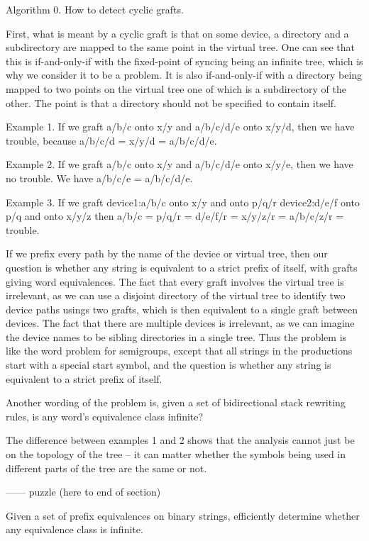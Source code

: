 \documentclass{book}
\begin{document}
Algorithm 0.   How to detect cyclic grafts.

First, what is meant by a cyclic graft is that on some device, a directory and a subdirectory are mapped to the same point in the virtual tree.  One can see that this is if-and-only-if with the fixed-point of syncing being an infinite tree, which is why we consider it to be a problem.  It is also if-and-only-if with a directory being mapped to two points on the virtual tree one of which is a subdirectory of the other.  The point is that a directory should not be specified to contain itself.

Example 1.  If we graft a/b/c onto x/y and a/b/c/d/e onto x/y/d, then we have trouble, because a/b/c/d = x/y/d = a/b/c/d/e.

Example 2.  If we graft a/b/c onto x/y and a/b/c/d/e onto x/y/e, then we have no trouble.  We have a/b/c/e = a/b/c/d/e.

Example 3.  If we graft
	device1:a/b/c onto x/y and onto p/q/r
	device2:d/e/f onto p/q and onto x/y/z
then a/b/c = p/q/r = d/e/f/r = x/y/z/r = a/b/c/z/r = trouble.

If we prefix every path by the name of the device or virtual tree, then our question is whether any string is equivalent to a strict prefix of itself, with grafts giving word equivalences.  The fact that every graft involves the virtual tree is irrelevant, as we can use a disjoint directory of the virtual tree to identify two device paths usings two grafts, which is then equivalent to a single graft between devices.  The fact that there are multiple devices is irrelevant, as we can imagine the device names to be sibling directories in a single tree.  Thus the problem is like the word problem for semigroups, except that all strings in the productions start with a special start symbol, and the question is whether any string is equivalent to a strict prefix of itself.

Another wording of the problem is, given a set of bidirectional stack rewriting rules, is any word's equivalence class infinite?

The difference between examples 1 and 2 shows that the analysis cannot just be on the topology of the tree -- it can matter whether the symbols being used in different parts of the tree are the same or not.

------ puzzle (here to end of section)

Given a set of prefix equivalences on binary strings, efficiently determine whether any equivalence class is infinite.
\end{document}
